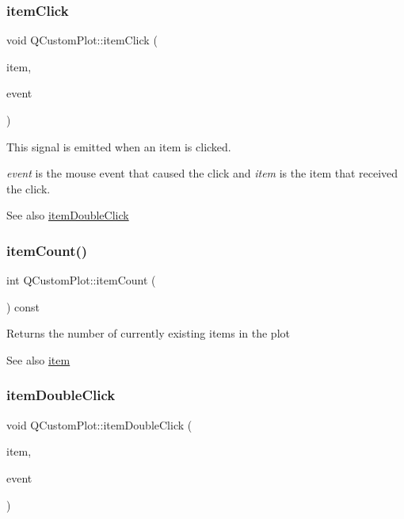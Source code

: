 \subsubsection{\texorpdfstring{item\+Click}{itemClick}}
{\footnotesize\ttfamily void Q\+Custom\+Plot\+::item\+Click (\begin{DoxyParamCaption}\item[{\mbox{\hyperlink{class_q_c_p_abstract_item}{Q\+C\+P\+Abstract\+Item}} $\ast$}]{item,  }\item[{Q\+Mouse\+Event $\ast$}]{event }\end{DoxyParamCaption})\hspace{0.3cm}{\ttfamily [signal]}}

This signal is emitted when an item is clicked.

{\itshape event} is the mouse event that caused the click and {\itshape item} is the item that received the click.

\begin{DoxySeeAlso}{See also}
\mbox{\hyperlink{class_q_custom_plot_ac83aa9f5a3e9bb3efc9cdc763dcd42a6}{item\+Double\+Click}} 
\end{DoxySeeAlso}
\mbox{\label{class_q_custom_plot_a16025daf0341f9362be3080e404424c2}} 
\subsubsection{\texorpdfstring{item\+Count()}{itemCount()}}
{\footnotesize\ttfamily int Q\+Custom\+Plot\+::item\+Count (\begin{DoxyParamCaption}{ }\end{DoxyParamCaption}) const}

Returns the number of currently existing items in the plot

\begin{DoxySeeAlso}{See also}
\mbox{\hyperlink{class_q_custom_plot_ac042f2e78edd228ccf2f26b7fe215239}{item}} 
\end{DoxySeeAlso}
\mbox{\label{class_q_custom_plot_ac83aa9f5a3e9bb3efc9cdc763dcd42a6}} 
\subsubsection{\texorpdfstring{item\+Double\+Click}{itemDoubleClick}}
{\footnotesize\ttfamily void Q\+Custom\+Plot\+::item\+Double\+Click (\begin{DoxyParamCaption}\item[{\mbox{\hyperlink{class_q_c_p_abstract_item}{Q\+C\+P\+Abstract\+Item}} $\ast$}]{item,  }\item[{Q\+Mouse\+Event $\ast$}]{event }\end{DoxyParamCaption})\hspace{0.3cm}{\ttfamily [signal]}}

